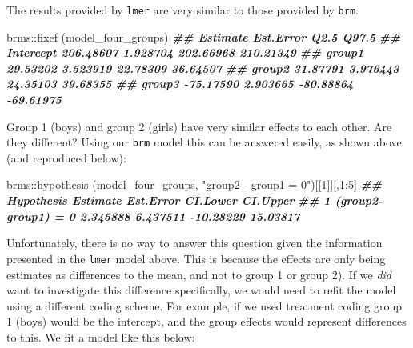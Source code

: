 \documentclass[
]{book}
\newenvironment{Shaded}{\begin{snugshade}}{\end{snugshade}}
\newcommand{\DecValTok}[1]{\textcolor[rgb]{0.00,0.00,0.81}{#1}}
\newcommand{\DocumentationTok}[1]{\textcolor[rgb]{0.56,0.35,0.01}{\textbf{\textit{#1}}}}
\newcommand{\FunctionTok}[1]{\textcolor[rgb]{0.00,0.00,0.00}{#1}}
\newcommand{\NormalTok}[1]{#1}
\newcommand{\SpecialCharTok}[1]{\textcolor[rgb]{0.00,0.00,0.00}{#1}}
\newcommand{\StringTok}[1]{\textcolor[rgb]{0.31,0.60,0.02}{#1}}
\begin{document}
The results provided by \texttt{lmer} are very similar to those provided by \texttt{brm}:

\begin{Shaded}
\begin{Highlighting}[]
\NormalTok{brms}\SpecialCharTok{::}\FunctionTok{fixef}\NormalTok{ (model\_four\_groups)}
\DocumentationTok{\#\#            Estimate Est.Error      Q2.5     Q97.5}
\DocumentationTok{\#\# Intercept 206.48607  1.928704 202.66968 210.21349}
\DocumentationTok{\#\# group1     29.53202  3.523919  22.78309  36.64507}
\DocumentationTok{\#\# group2     31.87791  3.976443  24.35103  39.68355}
\DocumentationTok{\#\# group3    {-}75.17590  2.903665 {-}80.88864 {-}69.61975}
\end{Highlighting}
\end{Shaded}

Group 1 (boys) and group 2 (girls) have very similar effects to each other. Are they different? Using our \texttt{brm} model this can be answered easily, as shown above (and reproduced below):

\begin{Shaded}
\begin{Highlighting}[]
\NormalTok{brms}\SpecialCharTok{::}\FunctionTok{hypothesis}\NormalTok{ (model\_four\_groups, }\StringTok{"group2 {-} group1 = 0"}\NormalTok{)[[}\DecValTok{1}\NormalTok{]][,}\DecValTok{1}\SpecialCharTok{:}\DecValTok{5}\NormalTok{]}
\DocumentationTok{\#\#            Hypothesis Estimate Est.Error  CI.Lower CI.Upper}
\DocumentationTok{\#\# 1 (group2{-}group1) = 0 2.345888  6.437511 {-}10.28229 15.03817}
\end{Highlighting}
\end{Shaded}

Unfortunately, there is no way to answer this question given the information presented in the \texttt{lmer} model above. This is because the effects are only being estimates as differences to the mean, and not to group 1 or group 2). If we \emph{did} want to investigate this difference specifically, we would need to refit the model using a different coding scheme. For example, if we used treatment coding group 1 (boys) would be the intercept, and the group effects would represent differences to this. We fit a model like this below:
\end{document}
